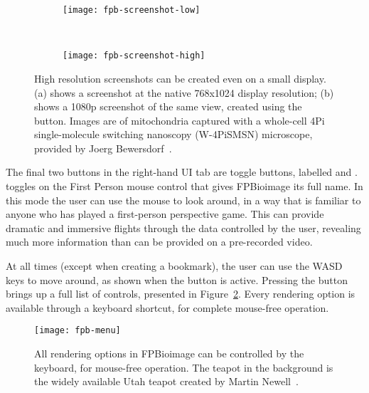 \begin{figure}[htbp!]
\centering
\begin{subfigure}[b]{1.0\textwidth}
\texttt{[image: fpb-screenshot-low]}
\caption{}
\end{subfigure}

~\newline
\begin{subfigure}[b]{1.0\textwidth}
\texttt{[image: fpb-screenshot-high]}
\caption{}
\end{subfigure}
\caption[FPBioimage: Screenshots allow views to be captured at a higher resolution than the user's display]{High resolution screenshots can be created even on a small display. (a) shows a screenshot at the native 768x1024 display resolution; (b) shows a 1080p screenshot of the same view, created using the  button. Images are of mitochondria captured with a whole-cell 4Pi single-molecule switching nanoscopy (W-4PiSMSN) microscope, provided by Joerg Bewersdorf~\cite{huang2016ultra}. }
\label{fig:fpbScreenshots}
\end{figure}

The final two buttons in the right-hand UI tab are toggle buttons, labelled  and .
 toggles on the First Person mouse control that gives FPBioimage its full name.
In this mode the user can use the mouse to look around, in a way that is familiar to anyone who has played a first-person perspective game.
This can provide dramatic and immersive flights through the data controlled by the user, revealing much more information than can be provided on a pre-recorded video.

At all times (except when creating a bookmark), the user can use the WASD keys to move around, as shown when the  button is active.
Pressing the  button brings up a full list of controls, presented in Figure~\ref{fig:fpbMenu}.
Every rendering option is available through a keyboard shortcut, for complete mouse-free operation.

\begin{figure}[tbp!]
\centering
\texttt{[image: fpb-menu]}
\caption[FPBioimage: Keyboard controls provide shortcuts to all FPBioimage functions, allowing mouse-free operation]{All rendering options in FPBioimage can be controlled by the keyboard, for mouse-free operation. The teapot in the background is the widely available Utah teapot created by Martin Newell~\cite{torrence2006martin}. }
\label{fig:fpbMenu}
\end{figure}

